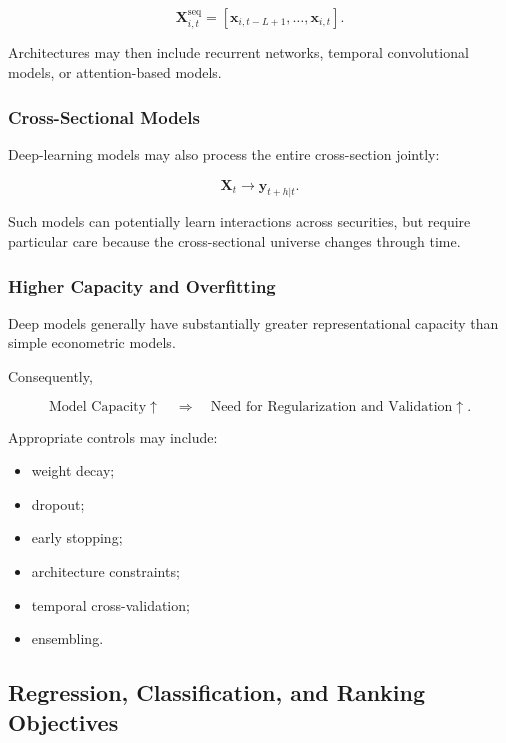\documentclass[11pt,a4paper]{article}
\begin{document}
\begin{equation}
\mathbf{X}_{i,t}^{\mathrm{seq}}
=
\left[
\mathbf{x}_{i,t-L+1},
\ldots,
\mathbf{x}_{i,t}
\right].
\end{equation}

Architectures may then include recurrent networks, temporal convolutional
models, or attention-based models.


\subsubsection{Cross-Sectional Models}

Deep-learning models may also process the entire cross-section jointly:

\begin{equation}
\mathbf{X}_t
\rightarrow
\widehat{\mathbf{y}}_{t+h|t}.
\end{equation}

Such models can potentially learn interactions across securities, but require
particular care because the cross-sectional universe changes through time.


\subsubsection{Higher Capacity and Overfitting}

Deep models generally have substantially greater representational capacity than
simple econometric models.

Consequently,

\begin{equation}
\boxed{
\text{Model Capacity}
\uparrow
\quad\Rightarrow\quad
\text{Need for Regularization and Validation}
\uparrow.
}
\end{equation}

Appropriate controls may include:

\begin{itemize}
    \item weight decay;
    \item dropout;
    \item early stopping;
    \item architecture constraints;
    \item temporal cross-validation;
    \item ensembling.
\end{itemize}


\subsection{Regression, Classification, and Ranking Objectives}
\label{subsec:prediction_objectives}
\end{document}
